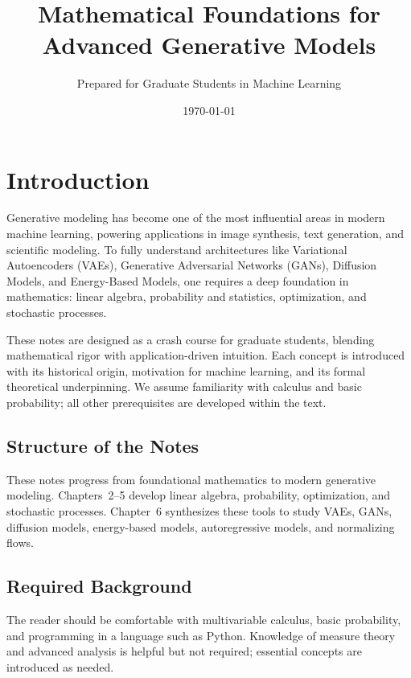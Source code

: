 \documentclass[11pt]{book}
\title{Mathematical Foundations for Advanced Generative Models}
\author{Prepared for Graduate Students in Machine Learning}
\date{\today}
\begin{document}
\maketitle
\tableofcontents

\chapter{Introduction}
Generative modeling has become one of the most influential areas in modern machine learning, powering applications in image synthesis, text generation, and scientific modeling. To fully understand architectures like Variational Autoencoders (VAEs), Generative Adversarial Networks (GANs), Diffusion Models, and Energy-Based Models, one requires a deep foundation in mathematics: linear algebra, probability and statistics, optimization, and stochastic processes.

These notes are designed as a crash course for graduate students, blending mathematical rigor with application-driven intuition. Each concept is introduced with its historical origin, motivation for machine learning, and its formal theoretical underpinning. We assume familiarity with calculus and basic probability; all other prerequisites are developed within the text.

\section{Structure of the Notes}
These notes progress from foundational mathematics to modern generative modeling. Chapters~2--5 develop linear algebra, probability, optimization, and stochastic processes. Chapter~6 synthesizes these tools to study VAEs, GANs, diffusion models, energy-based models, autoregressive models, and normalizing flows.

\section{Required Background}
The reader should be comfortable with multivariable calculus, basic probability, and programming in a language such as Python. Knowledge of measure theory and advanced analysis is helpful but not required; essential concepts are introduced as needed.
\end{document}
